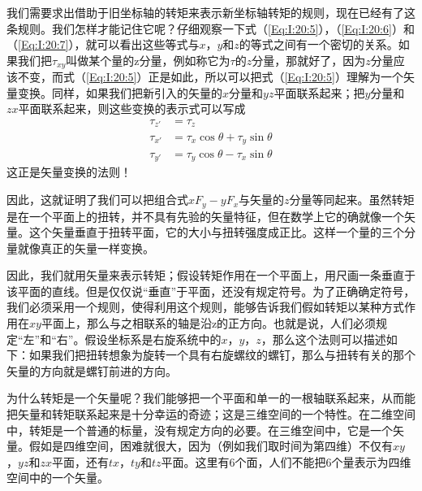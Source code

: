 我们需要求出借助于旧坐标轴的转矩来表示新坐标轴转矩的规则，现在已经有了这条规则。我们怎样才能记住它呢？仔细观察一下式（\ref{Eq:I:20:5}），（\ref{Eq:I:20:6}）和（\ref{Eq:I:20:7}），就可以看出这些等式与$x$，$y$和$z$的等式之间有一个密切的关系。如果我们把$\tau_{xy}$叫做某个量的z分量，例如称它为$\tau$的$z$分量，那就好了，因为$z$分量应该不变，而式（\ref{Eq:I:20:5}）正是如此，所以可以把式（\ref{Eq:I:20:5}）理解为一个矢量变换。同样，如果我们把新引入的矢量的$x$分量和$yz$平面联系起来；把$y$分量和$zx$平面联系起来，则这些变换的表示式可以写成
\begin{equation}
    \label{Eq:I:20:8}
    \begin{aligned}
        \tau_{z'} &= \tau_z \\
        \tau_{x'} &= \tau_x \cos \theta + \tau_y \sin \theta \\
        \tau_{y'} &= \tau_y \cos \theta - \tau_x \sin \theta 
    \end{aligned}
\end{equation}
这正是矢量变换的法则！

因此，这就证明了我们可以把组合式$xF_y-yF_x$与矢量的$z$分量等同起来。虽然转矩是在一个平面上的扭转，并不具有先验的矢量特征，但在数学上它的确就像一个矢量。这个矢量垂直于扭转平面，它的大小与扭转强度成正比。这样一个量的三个分量就像真正的矢量一样变换。

因此，我们就用矢量来表示转矩；假设转矩作用在一个平面上，用尺画一条垂直于该平面的直线。但是仅仅说“垂直”于平面，还没有规定符号。为了正确确定符号，我们必须采用一个规则，使得利用这个规则，能够告诉我们假如转矩以某种方式作用在$xy$平面上，那么与之相联系的轴是沿z的正方向。也就是说，人们必须规定“左”和“右”。假设坐标系是右旋系统中的$x$，$y$，$z$，那么这个法则可以描述如下：如果我们把扭转想象为旋转一个具有右旋螺纹的螺钉，那么与扭转有关的那个矢量的方向就是螺钉前进的方向。

为什么转矩是一个矢量呢？我们能够把一个平面和单一的一根轴联系起来，从而能把矢量和转矩联系起来是十分幸运的奇迹；这是三维空间的一个特性。在二维空间中，转矩是一个普通的标量，没有规定方向的必要。在三维空间中，它是一个矢量。假如是四维空间，困难就很大，因为（例如我们取时间为第四维）不仅有$xy$，$yz$和$zx$平面，还有$tx$，$ty$和$tz$平面。这里有6个面，人们不能把6个量表示为四维空间中的一个矢量。


